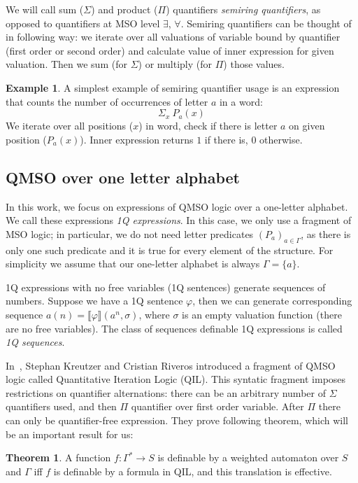 \documentclass[12pt]{article}
\theoremstyle{definition}
\newtheorem{theorem}{Theorem}[section]
\newtheorem{example}{Example}[section]
\begin{document}
We will call sum ($\Sigma$) and product ($\Pi$) quantifiers \emph{semiring quantifiers}, as opposed to quantifiers at MSO level $\exists$, $\forall$. Semiring quantifiers can be thought of in following way: we iterate over all valuations of variable bound by quantifier (first order or second order) and calculate value of inner expression for given valuation. Then we sum (for $\Sigma$) or multiply (for $\Pi$) those values.

\begin{example}
    A simplest example of semiring quantifier usage is an expression that counts the number of occurrences of letter $a$ in a word:
    $$\Sigma_x \ P_a(x)$$
    We iterate over all positions ($x$) in word, check if there is letter $a$ on given position ($P_a(x)$). Inner expression returns $1$ if there is, $0$ otherwise. 
\end{example}

\subsection{QMSO over one letter alphabet}

In this work, we focus on expressions of QMSO logic over a one-letter alphabet. We call these expressions \emph{1Q expressions}. In this case, we only use a fragment of MSO logic; in particular, we do not need letter predicates $(P_a)_{a \in \Gamma}$, as there is only one such predicate and it is true for every element of the structure. For simplicity we assume that our one-letter alphabet is always $\Gamma = \{a\}$.

1Q expressions with no free variables (1Q sentences) generate sequences of numbers. Suppose we have a 1Q sentence $\varphi$, then we can generate corresponding sequence $a(n) = \llbracket \varphi \rrbracket (a^n, \sigma)$, where $\sigma$ is an empty valuation function (there are no free variables). The class of sequences definable 1Q expressions is called \emph{1Q sequences}.

In~\cite[Section IV]{KreutzerR13}, Stephan Kreutzer and Cristian Riveros introduced a fragment of QMSO logic called Quantitative Iteration Logic (QIL). This syntatic fragment imposes restrictions on quantifier alternations: there can be an arbitrary number of $\Sigma$ quantifiers used, and then $\Pi$ quantifier over first order variable. After $\Pi$ there can only be quantifier-free expression. They prove following theorem, which will be an important result for us:

\begin{theorem}
\label{QILWL}
    A function $f: \Gamma^* \rightarrow S$ is definable by a weighted automaton over $S$ and $\Gamma$ iff $f$ is definable by a formula in QIL, and this translation is effective.
\end{theorem}
\end{document}
